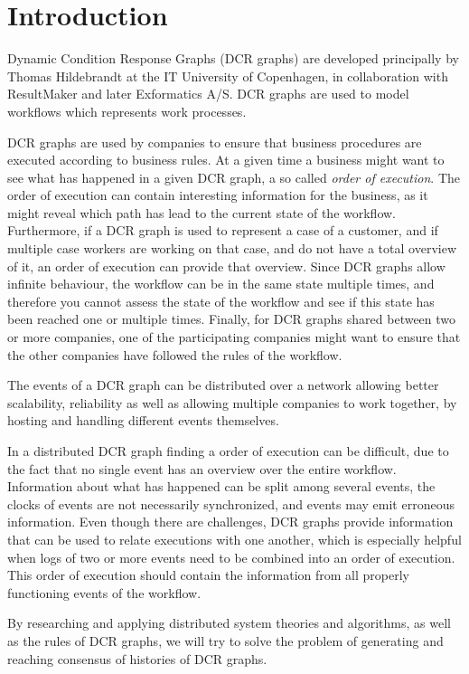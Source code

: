 \chapter{Introduction}
	Dynamic Condition Response Graphs (DCR graphs) are developed principally by Thomas Hildebrandt at the IT University of Copenhagen, in collaboration with ResultMaker and later Exformatics A/S. DCR graphs are used to model workflows which represents work processes.
	
	\newpar DCR graphs are used by companies to ensure that business procedures are executed according to business rules. At a given time a business might want to see what has happened in a given DCR graph, a so called \textit{order of execution}. The order of execution can contain interesting information for the business, as it might reveal which path has lead to the current state of the workflow. Furthermore, if a DCR graph is used to represent a case of a customer, and if multiple case workers are working on that case, and do not have a total overview of it, an order of execution can provide that overview. Since DCR graphs allow infinite behaviour, the workflow can be in the same state multiple times, and therefore you cannot assess the state of the workflow and see if this state has been reached one or multiple times. Finally, for DCR graphs shared between two or more companies, one of the participating companies might want to ensure that the other companies have followed the rules of the workflow.
	
	\newpar The events of a DCR graph can be distributed over a network allowing better scalability, reliability as well as allowing multiple companies to work together, by hosting and handling different events themselves.
	
	\newpar In a distributed DCR graph finding a order of execution can be difficult, due to the fact that no single event has an overview over the entire workflow. Information about what has happened can be split among several events, the clocks of events are not necessarily synchronized, and events may emit erroneous information. Even though there are challenges, DCR graphs provide information that can be used to relate executions with one another, which is especially helpful when logs of two or more events need to be combined into an order of execution. This order of execution should contain the information from all properly functioning events of the workflow.
	
	\newpar By researching and applying distributed system theories and algorithms, as well as the rules of DCR graphs, we will try to solve the problem of generating and reaching consensus of histories of DCR graphs. 
    
